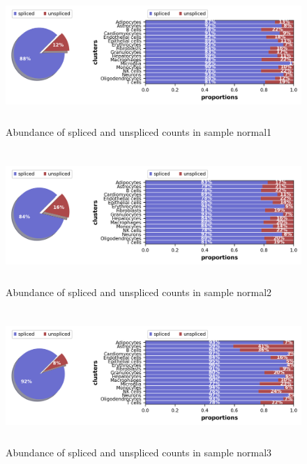 \begin{figure}[!htb]
\begin{center}
\includegraphics[width=6in,height=2in]{../figures/kidney_mouse/normal1_proportions.png}
\end{center}
\caption{Abundance of spliced and unspliced counts in sample normal1} 
\label{fig:abundance_normal1}
\end{figure}

\begin{figure}[!htb]
\begin{center}
\includegraphics[width=6in,height=2in]{../figures/kidney_mouse/normal2_proportions.png}
\end{center}
\caption{Abundance of spliced and unspliced counts in sample normal2} 
\label{fig:abundance_normal2}
\end{figure}

\begin{figure}[!htb]
\begin{center}
\includegraphics[width=6in,height=2in]{../figures/kidney_mouse/normal3_proportions.png}
\end{center}
\caption{Abundance of spliced and unspliced counts in sample normal3} 
\label{fig:abundance_normal3}
\end{figure}

